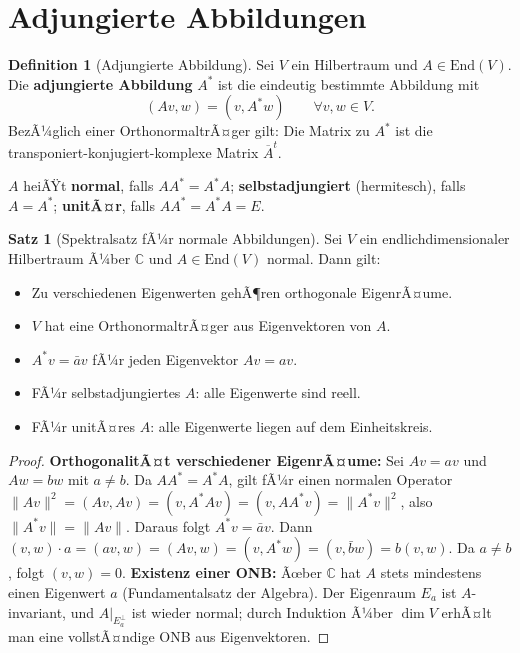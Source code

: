 ﻿\documentclass[a4paper,12pt]{report}
\theoremstyle{definition}
\newtheorem{definition}{Definition}
\newtheorem{satz}{Satz}
\begin{document}
\section{Adjungierte Abbildungen}

\begin{definition}[Adjungierte Abbildung]
    Sei $V$ ein Hilbertraum und $A \in \mathrm{End}(V)$. Die
    \textbf{adjungierte Abbildung} $A^*$ ist die eindeutig bestimmte
    Abbildung mit
    \[
        (Av, w) = (v, A^*w) \qquad \forall v, w \in V.
    \]
    BezÃ¼glich einer OrthonormaltrÃ¤ger gilt: Die Matrix zu $A^*$ ist die
    transponiert-konjugiert-komplexe Matrix $\overline{A}^t$.

    $A$ heiÃŸt \textbf{normal}, falls $AA^* = A^*A$;
    \textbf{selbstadjungiert} (hermitesch), falls $A = A^*$;
    \textbf{unitÃ¤r}, falls $AA^* = A^*A = E$.
\end{definition}

\begin{satz}[Spektralsatz fÃ¼r normale Abbildungen]
    Sei $V$ ein endlichdimensionaler Hilbertraum Ã¼ber $\mathbb{C}$ und
    $A \in \mathrm{End}(V)$ normal. Dann gilt:
    \begin{itemize}
        \item[-] Zu verschiedenen Eigenwerten gehÃ¶ren orthogonale EigenrÃ¤ume.
        \item[-] $V$ hat eine OrthonormaltrÃ¤ger aus Eigenvektoren von $A$.
        \item[-] $A^*v = \bar{a}v$ fÃ¼r jeden Eigenvektor $Av = av$.
        \item[-] FÃ¼r selbstadjungiertes $A$: alle Eigenwerte sind reell.
        \item[-] FÃ¼r unitÃ¤res $A$: alle Eigenwerte liegen auf dem Einheitskreis.
    \end{itemize}
\end{satz}
\begin{proof}
    \textbf{OrthogonalitÃ¤t verschiedener EigenrÃ¤ume:} Sei $Av = av$ und $Aw = bw$
    mit $a \neq b$. Da $AA^* = A^*A$, gilt fÃ¼r einen normalen Operator
    $\|Av\|^2 = (Av, Av) = (v, A^*Av) = (v, AA^*v) = \|A^*v\|^2$,
    also $\|A^*v\| = \|Av\|$. Daraus folgt $A^*v = \bar{a}v$.
    Dann $(v, w) \cdot a = (av, w) = (Av, w) = (v, A^*w) = (v, \bar{b}w) = b(v,w)$.
    Da $a \neq b$, folgt $(v, w) = 0$.
    \textbf{Existenz einer ONB:} Ãœber $\mathbb{C}$ hat $A$ stets mindestens
    einen Eigenwert $a$ (Fundamentalsatz der Algebra). Der Eigenraum $E_a$ ist
    $A$-invariant, und $A|_{E_a^\perp}$ ist wieder normal; durch Induktion
    Ã¼ber $\dim V$ erhÃ¤lt man eine vollstÃ¤ndige ONB aus Eigenvektoren.
\end{proof}
\end{document}
